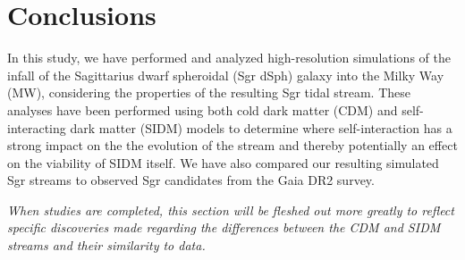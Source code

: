\chapter{Conclusions}
\label{sec:conclusions}

In this study, we have performed and analyzed high-resolution simulations of the
infall of the Sagittarius dwarf spheroidal (Sgr dSph) galaxy into the Milky
Way (MW), considering the properties of the resulting Sgr tidal stream. These
analyses have been performed using both cold dark matter (CDM) and
self-interacting dark matter (SIDM) models to determine where self-interaction
has a strong impact on the the evolution of the stream and thereby potentially
an effect on the viability of SIDM itself. We have also compared our resulting
simulated Sgr streams to observed Sgr candidates from the Gaia DR2 survey.

\textit{%
    When studies are completed, this section will be fleshed out more greatly to
    reflect specific discoveries made regarding the differences between the
    CDM and SIDM streams and their similarity to data.
}
